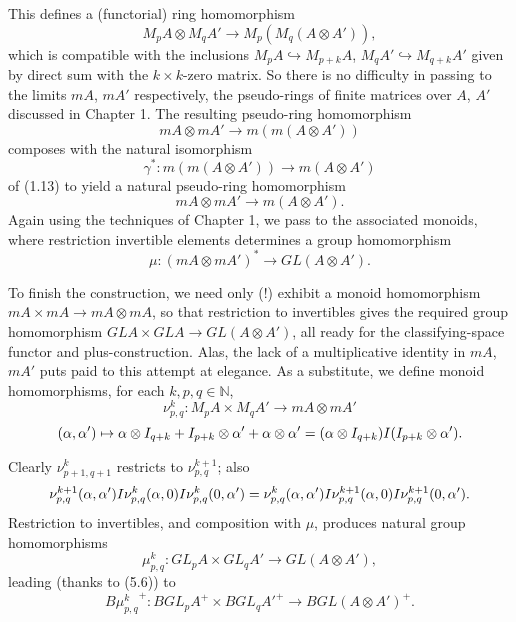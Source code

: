 \documentclass[openany,leqno]{book}  %
\newcommand{\N}{\mathbb{N}}
\begin{document}
This defines a (functorial) ring homomorphism
\[M_pA \otimes M_qA' \longrightarrow M_p(M_q(A \otimes A')),\]
which is compatible with the inclusions $M_pA \hookrightarrow M_{p+k}A$, $M_qA' \hookrightarrow M_{q+k}A'$ given by direct sum with the $k\times k$-zero matrix. So there is no difficulty in passing to the limits $mA$, $mA'$ respectively, the pseudo-rings of finite matrices over $A$, $A'$ discussed in Chapter 1. The resulting pseudo-ring homomorphism
\[mA \otimes mA' \longrightarrow m(m(A \otimes A'))\]
 composes with the natural isomorphism
 \[\gamma^* \colon  m(m(A \otimes A')) \longrightarrow m(A \otimes A')\]
of (1.13) to yield a natural pseudo-ring homomorphism 
\[mA \otimes mA'\longrightarrow m(A \otimes A').\]
Again using the techniques of Chapter 1, we pass to the associated monoids, where restriction invertible elements determines a group homomorphism
\[\mu \colon  (mA \otimes mA')^* \longrightarrow GL(A \otimes A').\]

To finish the construction, we need only (!) exhibit a monoid homomorphism
$mA \times mA \longrightarrow mA \otimes mA$, so that restriction to invertibles gives the required group homomorphism
$GLA \times GLA \longrightarrow GL(A \otimes A')$, all ready for the classifying-space functor and plus-construction.
Alas, the lack of a multiplicative identity in $mA$, $mA'$ puts paid to this attempt at elegance. As a substitute, we define monoid homomorphisms, for each $k, p, q \in \N$,
\[\nu_{p,q}^k\colon M_pA \times M_qA' \longrightarrow mA \otimes mA'\]
\[(\alpha, \alpha') \mapsto \alpha \otimes I_{q+k} + I_{p+k} \otimes  \alpha' +  \alpha \otimes  \alpha'
= ( \alpha \otimes I_{q+k}) \ding{73}(I_{p+k}\otimes \alpha').\]

Clearly $\nu_{p+1,q+1}^k$ restricts to $\nu_{p,q}^{k+1}$; also
\[\nu_{p,q}^{k+1} (\alpha, \alpha') \ding{73} \nu_{p,q}^k(\alpha,0) \ding{73} \nu_{p,q}^k (0,\alpha') = \nu_{p,q}^k(\alpha,\alpha') \ding{73} \nu_{p,q}^{k+1}(\alpha,0) \ding{73} \nu_{p,q}^{k+1} (0,\alpha').\]
Restriction to invertibles, and composition with $\mu$, produces natural group homomorphisms 
\[\mu_{p,q}^k \colon  GL_pA \times GL_qA' \longrightarrow GL(A \otimes A'),\]
leading (thanks to (5.6)) to
\[{B\mu_{p,q}^k}^+ \colon  {BGL_pA}^+ \times {BGL_qA'}^+ \longrightarrow {BGL(A \otimes A')}^+.\]
\end{document}
